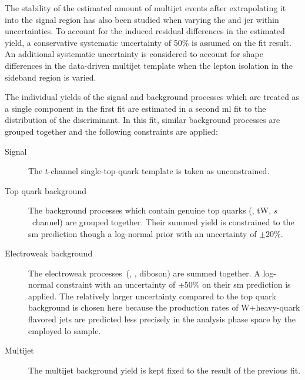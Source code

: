 
The stability of the estimated amount of multijet events after extrapolating it into the signal region has also been studied when varying the  and \acrlong{jer} within uncertainties. To account for the induced residual differences in the estimated yield, a conservative systematic uncertainty of 50\% is assumed on the fit result. An additional systematic uncertainty is considered to account for shape differences in the data-driven multijet template when the lepton isolation in the sideband region is varied.

The individual yields of the signal and background processes which are treated as a single component in the first fit are estimated in a second \gls{ml} fit to the distribution of the \bdttch discriminant. In this fit, similar background processes are grouped together and the following constraints are applied:

\begin{description}
\item[Signal] The $t$-channel single-top-quark template is taken as unconstrained.
\item[Top quark background] The background processes which contain genuine top quarks (\ttbar, tW, $s$~channel) are grouped together. Their summed yield is constrained to the \gls{sm} prediction though a log-normal prior with an uncertainty of $\pm20\%$.
\item[Electroweak background] The electroweak processes~(\wjets, \zjets, diboson) are summed together. A log-normal constraint with an uncertainty of $\pm50\%$ on their \gls{sm} prediction is applied. The relatively larger uncertainty compared to the top quark background is chosen here because the production rates of W+heavy-quark flavored jets are predicted less precisely in the analysis phase space by the employed \wjets \gls{lo} \MG sample.
\item[Multijet] The multijet background yield is kept fixed to the result of the previous fit.
\end{description}

